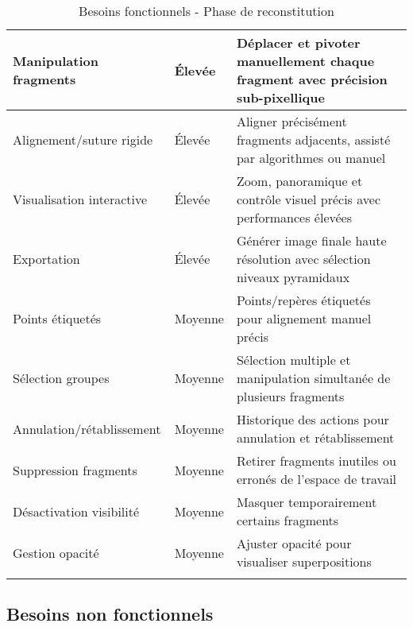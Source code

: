 \documentclass[12pt,a4paper]{report}
\begin{document}
\begin{}
\begin{}
\begin{}
\begin{longtable}{|p{3.5cm}|p{1.5cm}|p{9cm}|}
Manipulation fragments & Élevée & Déplacer et pivoter manuellement chaque fragment avec précision sub-pixellique \\
\hline

Alignement/suture rigide & Élevée & Aligner précisément fragments adjacents, assisté par algorithmes ou manuel \\
\hline

Visualisation interactive & Élevée & Zoom, panoramique et contrôle visuel précis avec performances élevées \\
\hline

Exportation & Élevée & Générer image finale haute résolution avec sélection niveaux pyramidaux \\
\hline

Points étiquetés & Moyenne & Points/repères étiquetés pour alignement manuel précis \\
\hline

Sélection groupes & Moyenne & Sélection multiple et manipulation simultanée de plusieurs fragments \\
\hline

Annulation/rétablissement & Moyenne & Historique des actions pour annulation et rétablissement \\
\hline

Suppression fragments & Moyenne & Retirer fragments inutiles ou erronés de l'espace de travail \\
\hline

Désactivation visibilité & Moyenne & Masquer temporairement certains fragments \\
\hline

Gestion opacité & Moyenne & Ajuster opacité pour visualiser superpositions \\
\hline

\caption{Besoins fonctionnels - Phase de reconstitution}
\end{longtable}

\subsection{Besoins non fonctionnels}

\vspace{1em}
\end{}
\end{}
\end{}
\end{document}
